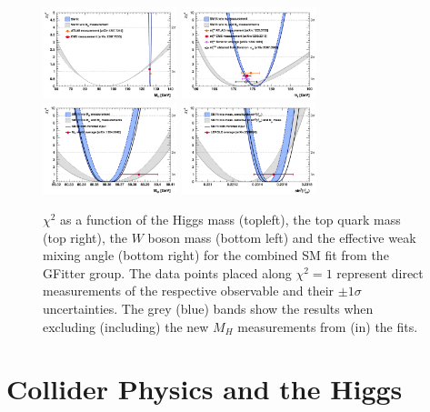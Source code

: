 
\begin{figure}[!t]
\centering 
\includegraphics[width=0.35\textwidth]{figs/HiggsScan.pdf}
\includegraphics[width=0.35\textwidth]{figs/TopScan.pdf}
\includegraphics[width=0.35\textwidth]{figs/WMassScan.pdf}
\includegraphics[width=0.35\textwidth]{figs/Sin2ThetaScan.pdf}
\caption{
$\chi^2$ as a function of the Higgs mass (topleft), the top quark mass (top
    right), the $W$ boson mass (bottom left) and the effective weak mixing
  angle (bottom right) for the combined SM fit from the GFitter group.  The
  data points placed along $\chi^2=1$ represent direct measurements of the
  respective observable and their $\pm 1\sigma$ uncertainties.  The grey (blue)
  bands show the results when excluding (including) the new $M_H$ measurements
  from (in) the fits. } \label{figure:theory_scans}
\end{figure}


\section{Collider Physics and the Higgs} 

